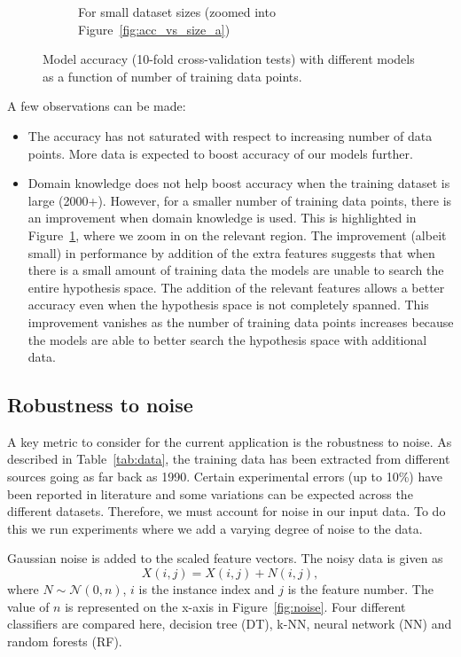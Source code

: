 \documentclass{article}
\begin{document}
\begin{figure}[h!]
\begin{subfigure}[b]{0.475\textwidth}
        \caption{For small dataset sizes (zoomed into Figure~\ref{fig:acc_vs_size_a})}
        \label{fig:acc_vs_size_b}
    \end{subfigure}
    \caption{Model accuracy (10-fold cross-validation tests) with different models as a function of number of training data points.}\label{fig:acc_vs_size}
\end{figure}


A few observations can be made:
\begin{itemize}
\item The accuracy has not saturated with respect to increasing number of data points. More data is expected to boost accuracy of our models further.
\item Domain knowledge does not help boost accuracy when the training dataset is large (2000+). However, for a smaller number of training data points, there is an improvement when domain knowledge is used. This is highlighted in Figure~\ref{fig:acc_vs_size_b}, where we zoom in on the relevant region.
\subitem The improvement (albeit small) in performance by addition of the extra features suggests that when there is a small amount of training data the models are unable to search the entire hypothesis space. The addition of the relevant features allows a better accuracy even when the hypothesis space is not completely spanned.
\subitem This improvement vanishes as the number of training data points increases because the models are able to better search the hypothesis space with additional data.
\end{itemize}


\subsection{Robustness to noise}
A key metric to consider for the current application is the robustness to noise. As described in Table~\ref{tab:data}, the training data has been extracted from different sources going as far back as 1990. Certain experimental errors (up to 10\%) have been reported in literature and some variations can be expected across the different datasets. Therefore, we must account for noise in our input data. To do this we run experiments where we add a varying degree of noise to the data.

Gaussian noise is added to the scaled feature vectors. The noisy data is given as 
\begin{equation}
X(i, j) = X(i, j) + N(i, j),
\end{equation}
where $N \sim \mathcal{N}(0, n)$, $i$ is the instance index and $j$ is the feature number. The value of $n$ is represented on the x-axis in Figure~\ref{fig:noise}. Four different classifiers are compared here, decision tree (DT), k-NN, neural network (NN) and random forests (RF). 
\end{document}
